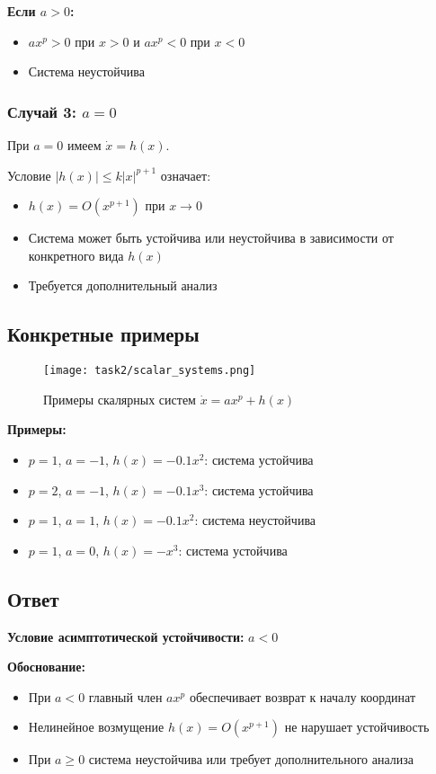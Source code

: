 \textbf{Если $a > 0$:}
\begin{itemize}
\item $ax^p > 0$ при $x > 0$ и $ax^p < 0$ при $x < 0$
\item Система неустойчива
\end{itemize}

\subsubsection{Случай 3: $a = 0$}

При $a = 0$ имеем $\dot{x} = h(x)$.

Условие $|h(x)| \leq k|x|^{p+1}$ означает:
\begin{itemize}
\item $h(x) = O(x^{p+1})$ при $x \to 0$
\item Система может быть устойчива или неустойчива в зависимости от конкретного вида $h(x)$
\item Требуется дополнительный анализ
\end{itemize}

\subsection{Конкретные примеры}

\begin{figure}[H]
\centering
\texttt{[image: task2/scalar\_systems.png]}
\caption{Примеры скалярных систем $\dot{x} = ax^p + h(x)$}
\label{fig:scalar_systems}
\end{figure}

\textbf{Примеры:}
\begin{itemize}
\item $p = 1$, $a = -1$, $h(x) = -0.1x^2$: система устойчива
\item $p = 2$, $a = -1$, $h(x) = -0.1x^3$: система устойчива  
\item $p = 1$, $a = 1$, $h(x) = -0.1x^2$: система неустойчива
\item $p = 1$, $a = 0$, $h(x) = -x^3$: система устойчива
\end{itemize}

\subsection{Ответ}

\textbf{Условие асимптотической устойчивости:} $a < 0$

\textbf{Обоснование:}
\begin{itemize}
\item При $a < 0$ главный член $ax^p$ обеспечивает возврат к началу координат
\item Нелинейное возмущение $h(x) = O(x^{p+1})$ не нарушает устойчивость
\item При $a \geq 0$ система неустойчива или требует дополнительного анализа
\end{itemize}

